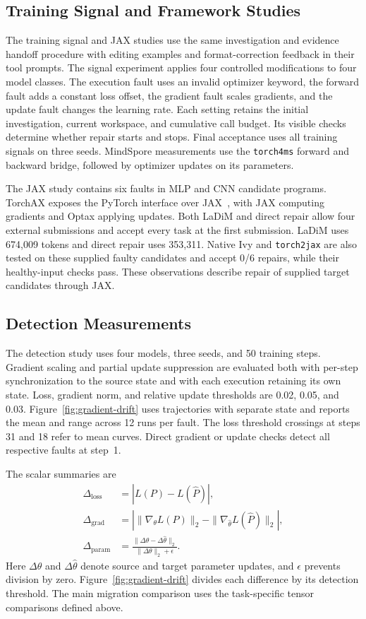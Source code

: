 \documentclass{article}
\begin{document}
\subsection{Training Signal and Framework Studies}

The training signal and JAX studies use the same investigation and evidence handoff procedure with editing examples and format-correction feedback in their tool prompts. The signal experiment applies four controlled modifications to four model classes. The execution fault uses an invalid optimizer keyword, the forward fault adds a constant loss offset, the gradient fault scales gradients, and the update fault changes the learning rate. Each setting retains the initial investigation, current workspace, and cumulative call budget. Its visible checks determine whether repair starts and stops. Final acceptance uses all training signals on three seeds. MindSpore measurements use the \texttt{torch4ms} forward and backward bridge, followed by optimizer updates on its parameters.

The JAX study contains six faults in MLP and CNN candidate programs. TorchAX exposes the PyTorch interface over JAX~\citep{google2025torchax}, with JAX computing gradients and Optax applying updates. Both LaDiM and direct repair allow four external submissions and accept every task at the first submission. LaDiM uses 674,009 tokens and direct repair uses 353,311. Native Ivy and \texttt{torch2jax} are also tested on these supplied faulty candidates and accept 0/6 repairs, while their healthy-input checks pass. These observations describe repair of supplied target candidates through JAX.

\subsection{Detection Measurements}

The detection study uses four models, three seeds, and 50 training steps. Gradient scaling and partial update suppression are evaluated both with per-step synchronization to the source state and with each execution retaining its own state. Loss, gradient norm, and relative update thresholds are 0.02, 0.05, and 0.03. Figure~\ref{fig:gradient-drift} uses trajectories with separate state and reports the mean and range across 12 runs per fault. The loss threshold crossings at steps 31 and 18 refer to mean curves. Direct gradient or update checks detect all respective faults at step~1.

The scalar summaries are
\begin{align}
\Delta_{\mathrm{loss}} &= |L(P)-L(\hat P)|, \\
\Delta_{\mathrm{grad}} &= \left|\|\nabla_{\theta}L(P)\|_2-\|\nabla_{\hat\theta}L(\hat P)\|_2\right|, \\
\Delta_{\mathrm{param}} &= \frac{\|\Delta\theta-\Delta\hat\theta\|_2}{\|\Delta\theta\|_2+\epsilon}.
\end{align}
Here $\Delta\theta$ and $\Delta\hat\theta$ denote source and target parameter updates, and $\epsilon$ prevents division by zero. Figure~\ref{fig:gradient-drift} divides each difference by its detection threshold. The main migration comparison uses the task-specific tensor comparisons defined above.
\end{document}
